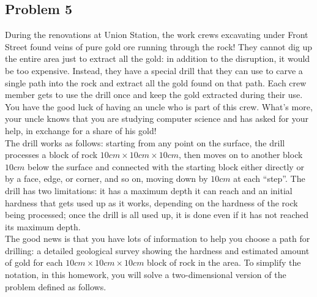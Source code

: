 \documentclass[11pt]{article}
\begin{document}
\subsection*{Problem 5}
During the renovations at Union Station, the work crews excavating under Front Street found veins of pure gold ore running through the rock! They cannot dig up the entire area just to extract all the gold: in addition to the disruption, it would be too expensive. Instead, they have a special drill that they can use to carve a single path into the rock and extract all the gold found on that path. Each crew member gets to use the drill once and keep the gold extracted during their use. You have the good luck of having an uncle who is part of this crew. What’s more, your uncle knows that you are studying computer science and has asked for your help, in exchange for a share of his gold! \\
The drill works as follows: starting from any point on the surface, the drill processes a block of rock $10cm \times 10cm \times 10cm$, then moves on to another block $10cm$ below the surface and connected with the starting block either directly or by a face, edge, or corner, and so on, moving down by $10cm$ at each “step”. The drill has two limitations: it has a maximum depth it can reach and an initial hardness that gets used up as it works, depending on the hardness of the rock being processed; once the drill is all used up, it is done even if it has not reached its maximum depth. \\
The good news is that you have lots of information to help you choose a path for drilling: a detailed geological survey showing the hardness and estimated amount of gold for each $10cm \times 10cm \times 10cm$ block of rock in the area. To simplify the notation, in this homework, you will solve a two-dimensional version of the problem defined as follows.
\end{document}
